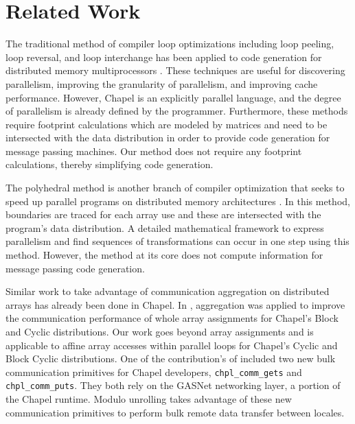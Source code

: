 \section{Related Work}\label{sec:relwork}

The traditional method of compiler loop optimizations including loop peeling, loop reversal, and loop interchange has been applied to code generation for distributed memory multiprocessors \cite{callahan1988compiling, ramanujam1991compile}. These techniques are useful for discovering parallelism, improving the granularity of parallelism, and improving cache performance. However, Chapel is an explicitly parallel language, and the degree of parallelism is already defined by the programmer. Furthermore, these methods require footprint calculations which are modeled by matrices and need to be intersected with the data distribution in order to provide code generation for message passing machines. Our method does not require any footprint calculations, thereby simplifying code generation. 

The polyhedral method is another branch of compiler optimization that seeks to speed up parallel programs on distributed memory architectures \cite{chavarria2005effective, germain1995automatic, Gupta91automaticdata, gupta1996compiling, iancu2008performance, wei1998compiling}. In this method, boundaries are traced for each array use and these are intersected with the program's data distribution. A detailed mathematical framework to express parallelism and find sequences of transformations can occur in one step using this method. However, the method at its core does not compute information for message passing code generation. 

Similar work to take advantage of communication aggregation on distributed arrays has already been done in Chapel. In \cite{sanz2012global}, aggregation was applied to improve the communication performance of whole array assignments for Chapel's Block and Cyclic distributions. Our work goes beyond array assignments and is applicable to affine array accesses within parallel loops for Chapel's Cyclic and Block Cyclic distributions. One of the contribution's of \cite{sanz2012global} included two new bulk communication primitives for Chapel developers, \texttt{chpl\_comm\_gets} and \texttt{chpl\_comm\_puts}. They both rely on the GASNet networking layer, a portion of the Chapel runtime.  Modulo unrolling takes advantage of these new communication primitives to perform bulk remote data transfer between locales.


